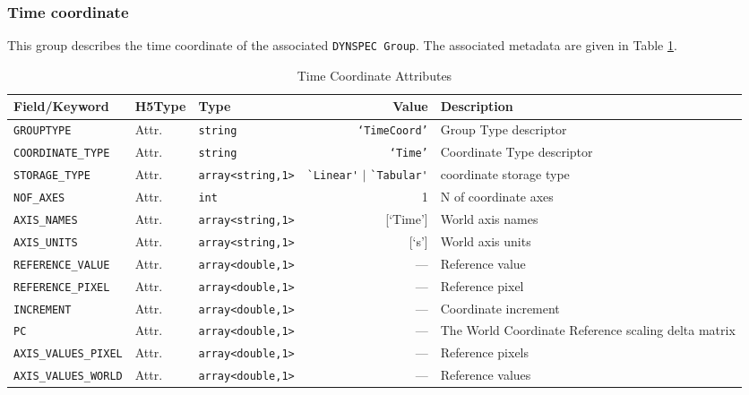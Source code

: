 \documentclass[a4paper,10pt,bibtotoc]{scrartcl}
\begin{document}

\subsubsection{Time coordinate}
\label{sec:coord-linear}

This group describes the time coordinate of the associated 
\texttt{DYNSPEC Group}. The associated metadata are given in Table
\ref{tab:time coords attributes}.

\begin{table}
\begin{center}
  \begin{tabular}{|lllrp{5cm}|}
    \hline
    \sc Field/Keyword & \sc H5Type & \sc Type & \sc Value & \sc Description \\
    \hline \hline
    \small{\verb|GROUPTYPE|} & Attr. & \verb|string| & \small{\texttt{`TimeCoord'}} & Group Type descriptor \\
    \small{\verb|COORDINATE_TYPE|} & Attr. & \verb|string| & \small{\texttt{`Time'}} & Coordinate Type descriptor \\
    \small{\verb|STORAGE_TYPE|} & Attr. & \small\verb|array<string,1>| & 
    	\small \verb|`Linear'| $|$ \verb|`Tabular'| & coordinate storage type \\ 
    \small{\verb|NOF_AXES|} & Attr. & \verb|int| & 1 & N of coordinate axes \\
    \small{\verb|AXIS_NAMES|} & Attr. & \verb|array<string,1>| & [`Time'] & World axis names \\
    \small{\verb|AXIS_UNITS|} & Attr. & \verb|array<string,1>| & [`s'] & World axis units \\
    \small{\verb|REFERENCE_VALUE|} & Attr. & \verb|array<double,1>| & --- & Reference value \\
    \small{\verb|REFERENCE_PIXEL|} & Attr. & \verb|array<double,1>| & --- & Reference pixel \\
    \small{\verb|INCREMENT|} & Attr. & \verb|array<double,1>| & --- & Coordinate increment \\
    \small{\verb|PC|} & Attr. & \verb|array<double,1>| & ---& The World Coordinate Reference scaling delta matrix \\
    \small{\verb|AXIS_VALUES_PIXEL|} & Attr. & \verb|array<double,1>| & --- & Reference pixels \\
    \small{\verb|AXIS_VALUES_WORLD|} & Attr. & \verb|array<double,1>| & --- & Reference values \\
    \hline
  \end{tabular}
  \caption{Time Coordinate Attributes\label{tab:time coords attributes}}
\end{center}
\end{table}
\end{document}
